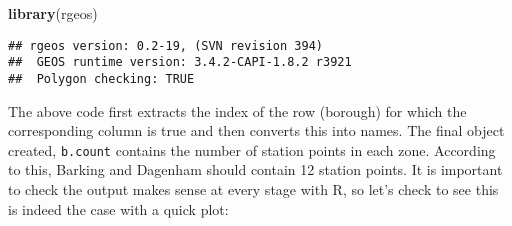 \documentclass[]{article}
\newenvironment{Shaded}{}{}
\newcommand{\KeywordTok}[1]{\textcolor[rgb]{0.00,0.44,0.13}{\textbf{{#1}}}}
\newcommand{\DataTypeTok}[1]{\textcolor[rgb]{0.56,0.13,0.00}{{#1}}}
\newcommand{\DecValTok}[1]{\textcolor[rgb]{0.25,0.63,0.44}{{#1}}}
\newcommand{\StringTok}[1]{\textcolor[rgb]{0.25,0.44,0.63}{{#1}}}
\newcommand{\CommentTok}[1]{\textcolor[rgb]{0.38,0.63,0.69}{\textit{{#1}}}}
\newcommand{\OtherTok}[1]{\textcolor[rgb]{0.00,0.44,0.13}{{#1}}}
\newcommand{\NormalTok}[1]{{#1}}
\begin{document}
\begin{Shaded}
\begin{Highlighting}[]
\KeywordTok{library}\NormalTok{(rgeos) }
\end{Highlighting}
\end{Shaded}

\begin{verbatim}
## rgeos version: 0.2-19, (SVN revision 394)
##  GEOS runtime version: 3.4.2-CAPI-1.8.2 r3921 
##  Polygon checking: TRUE
\end{verbatim}

\begin{Shaded}
\end{Shaded}

The above code first extracts the index of the row (borough) for which
the corresponding column is true and then converts this into names. The
final object created, \texttt{b.count} contains the number of station
points in each zone. According to this, Barking and Dagenham should
contain 12 station points. It is important to check the output makes
sense at every stage with R, so let's check to see this is indeed the
case with a quick plot:

\begin{Shaded}
\end{Shaded}
\end{document}
